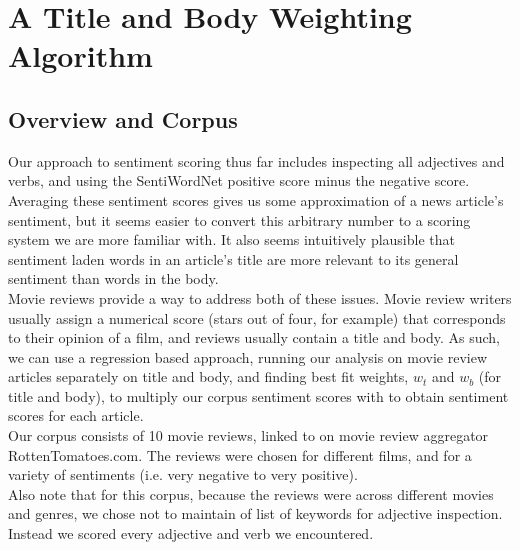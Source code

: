 \documentclass[pageno]{jpaper}
\begin{document}
\section{A Title and Body Weighting Algorithm}
\subsection{Overview and Corpus}
\indent Our approach to sentiment scoring thus far includes inspecting all adjectives and verbs, and using the SentiWordNet positive score minus the negative score. Averaging these sentiment scores gives us some approximation of a news article's sentiment, but it seems easier to convert this arbitrary number to a scoring system we are more familiar with. It also seems intuitively plausible that sentiment laden words in an article's title are more relevant to its general sentiment than words in the body. \\
\indent Movie reviews provide a way to address both of these issues. Movie review writers usually assign a numerical score (stars out of four, for example) that corresponds to their opinion of a film, and reviews usually contain a title and body. As such, we can use a regression based approach, running our analysis on movie review articles separately on title and body, and finding best fit weights, $w_t$ and $w_b$ (for title and body), to multiply our corpus sentiment scores with to obtain sentiment scores for each article. \\
\indent Our corpus consists of 10 movie reviews, linked to on movie review aggregator RottenTomatoes.com. The reviews were chosen for different films, and for a variety of sentiments (i.e. very negative to very positive). \\
\indent Also note that for this corpus, because the reviews were across different movies and genres, we chose not to maintain of list of keywords for adjective inspection. Instead we scored every adjective and verb we encountered.
\end{document}
